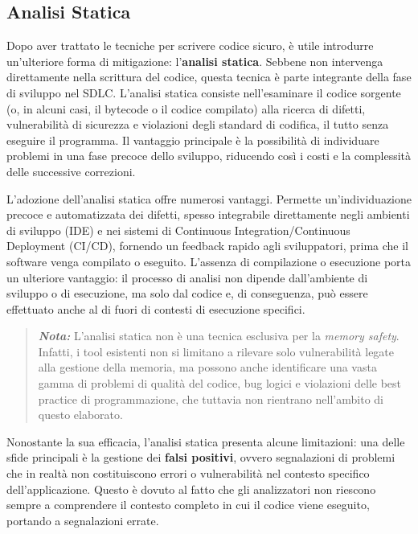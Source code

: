 \subsection{Analisi Statica}
\label{sec:analisi-statica}

Dopo aver trattato le tecniche per scrivere codice sicuro, è utile introdurre un'ulteriore
forma di mitigazione: l'\textbf{analisi statica}. Sebbene non intervenga
direttamente nella scrittura del codice, questa tecnica è parte integrante della
fase di sviluppo nel SDLC. L'analisi statica consiste nell'esaminare il codice
sorgente (o, in alcuni casi, il bytecode o il codice compilato) alla ricerca di
difetti, vulnerabilità di sicurezza e violazioni degli standard di codifica, il
tutto senza eseguire il programma. Il vantaggio principale è la possibilità di individuare
problemi in una fase precoce dello sviluppo, riducendo così i costi e la
complessità delle successive correzioni.

L'adozione dell'analisi statica offre numerosi vantaggi. Permette un'individuazione
precoce e automatizzata dei difetti, spesso integrabile direttamente negli
ambienti di sviluppo (IDE) e nei sistemi di Continuous Integration/Continuous
Deployment (CI/CD), fornendo un feedback rapido agli sviluppatori, prima che il
software venga compilato o eseguito. L'assenza di compilazione o esecuzione porta
un ulteriore vantaggio: il processo di analisi non dipende dall'ambiente di
sviluppo o di esecuzione, ma solo dal codice e, di conseguenza, può essere effettuato
anche al di fuori di contesti di esecuzione specifici.

\begin{quote}
  \textbf{\textit{Nota:}} L'analisi statica non è una tecnica esclusiva per la
  \textit{memory safety}. Infatti, i tool esistenti non si limitano a rilevare solo
  vulnerabilità legate alla gestione della memoria, ma possono anche
  identificare una vasta gamma di problemi di qualità del codice, bug logici e violazioni
  delle best practice di programmazione, che tuttavia non rientrano nell'ambito
  di questo elaborato.
\end{quote}

\noindent
Nonostante la sua efficacia, l'analisi statica presenta alcune limitazioni: una
delle sfide principali è la gestione dei \textbf{falsi positivi}, ovvero
segnalazioni di problemi che in realtà non costituiscono errori o vulnerabilità
nel contesto specifico dell'applicazione. Questo è dovuto al fatto che gli analizzatori
non riescono sempre a comprendere il contesto completo in cui il codice viene eseguito,
portando a segnalazioni errate.

